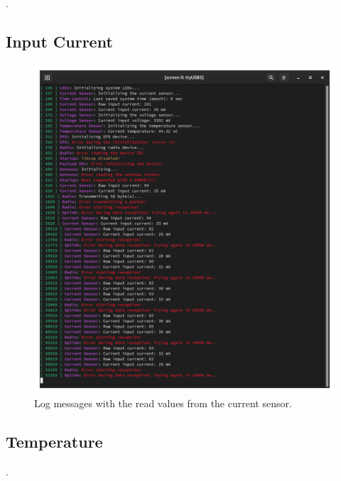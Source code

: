 .

\subsection{Input Current}

\begin{figure}[!ht]
    \begin{center}
        \includegraphics[width=0.8\columnwidth]{figures/v05/log-current-sensor.png}
        \caption{Log messages with the read values from the current sensor.}
        \label{fig:log-current-sensor}
    \end{center}
\end{figure}

\subsection{Temperature}

.
